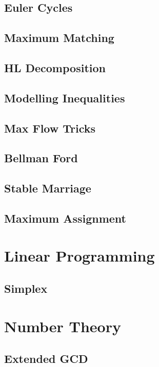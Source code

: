 		\subsection{Euler Cycles}
			
		\subsection{Maximum Matching}
			
		\subsection{HL Decomposition}
			
		\subsection{Modelling Inequalities}
			
		\subsection{Max Flow Tricks}
			
		\subsection{Bellman Ford}
			
		\subsection{Stable Marriage}
			
		\subsection{Maximum Assignment}
			
	\section{Linear Programming}
		\subsection{Simplex}
			
	\section{Number Theory}
		\subsection{Extended GCD}
			
